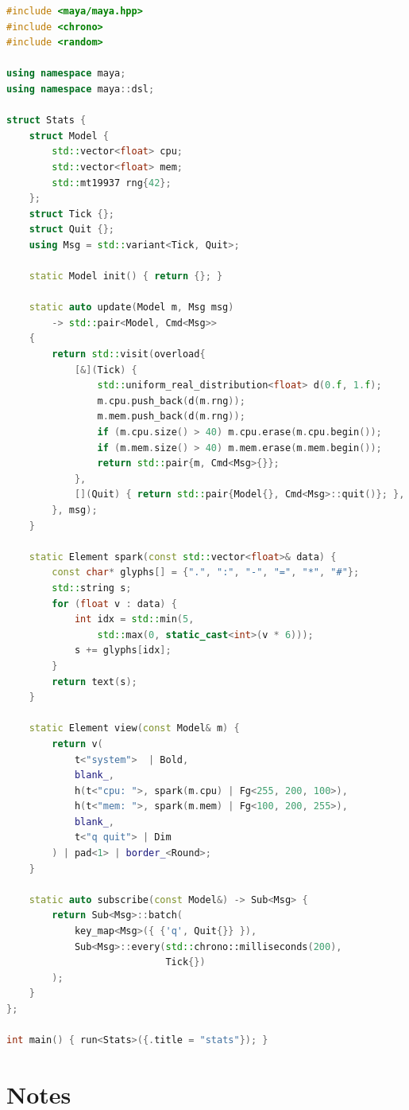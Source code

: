 \begin{lstlisting}[language=C++]
#include <maya/maya.hpp>
#include <chrono>
#include <random>

using namespace maya;
using namespace maya::dsl;

struct Stats {
    struct Model {
        std::vector<float> cpu;
        std::vector<float> mem;
        std::mt19937 rng{42};
    };
    struct Tick {};
    struct Quit {};
    using Msg = std::variant<Tick, Quit>;

    static Model init() { return {}; }

    static auto update(Model m, Msg msg)
        -> std::pair<Model, Cmd<Msg>>
    {
        return std::visit(overload{
            [&](Tick) {
                std::uniform_real_distribution<float> d(0.f, 1.f);
                m.cpu.push_back(d(m.rng));
                m.mem.push_back(d(m.rng));
                if (m.cpu.size() > 40) m.cpu.erase(m.cpu.begin());
                if (m.mem.size() > 40) m.mem.erase(m.mem.begin());
                return std::pair{m, Cmd<Msg>{}};
            },
            [](Quit) { return std::pair{Model{}, Cmd<Msg>::quit()}; },
        }, msg);
    }

    static Element spark(const std::vector<float>& data) {
        const char* glyphs[] = {".", ":", "-", "=", "*", "#"};
        std::string s;
        for (float v : data) {
            int idx = std::min(5,
                std::max(0, static_cast<int>(v * 6)));
            s += glyphs[idx];
        }
        return text(s);
    }

    static Element view(const Model& m) {
        return v(
            t<"system">  | Bold,
            blank_,
            h(t<"cpu: ">, spark(m.cpu) | Fg<255, 200, 100>),
            h(t<"mem: ">, spark(m.mem) | Fg<100, 200, 255>),
            blank_,
            t<"q quit"> | Dim
        ) | pad<1> | border_<Round>;
    }

    static auto subscribe(const Model&) -> Sub<Msg> {
        return Sub<Msg>::batch(
            key_map<Msg>({ {'q', Quit{}} }),
            Sub<Msg>::every(std::chrono::milliseconds(200),
                            Tick{})
        );
    }
};

int main() { run<Stats>({.title = "stats"}); }
\end{lstlisting}

\section{Notes}

